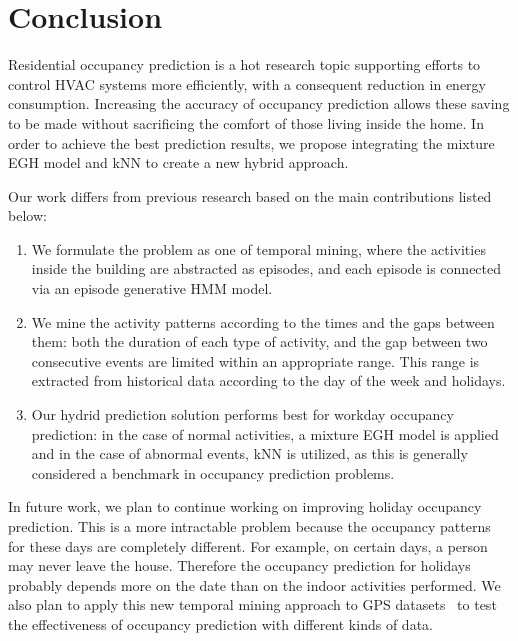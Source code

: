 \section{Conclusion}
Residential occupancy prediction is a hot research topic supporting efforts to control HVAC systems more efficiently, 
with a consequent reduction in energy consumption. 
Increasing the accuracy of occupancy prediction allows these saving to be made 
without sacrificing the comfort of those living inside 
the home. 
In order to achieve the best prediction results, 
we propose integrating the mixture EGH model and 
kNN to create a new hybrid approach.

Our work differs from previous research based on the main contributions listed below:
\begin{enumerate}
\item We formulate the problem as one of temporal mining, 
where the activities inside the building are abstracted as episodes, 
and each episode is connected via an episode generative HMM model.
\item We mine the activity patterns according to the times and the gaps between them: 
both the duration of each type of 
activity, and the gap between two consecutive events are limited within an appropriate range. 
This range is extracted from historical data according to the day of the week and holidays.
\item Our hydrid prediction solution performs best for workday occupancy prediction: 
in the case of normal activities, a mixture EGH model is applied and
in the case of abnormal events, kNN is utilized,  
as this is generally considered a benchmark in occupancy prediction problems. 
\end{enumerate}

In future work, we plan to continue working on improving holiday occupancy prediction. 
This is a  more intractable problem because 
the occupancy patterns for these days are completely different. 
For example, on certain days, a person may never leave the house. 
Therefore the occupancy prediction for holidays probably depends more on the date than on the indoor activities performed. 
We also plan to apply this new temporal mining approach to GPS datasets~\cite{koehler2013therml}
to test the effectiveness of occupancy prediction with different kinds of data. 